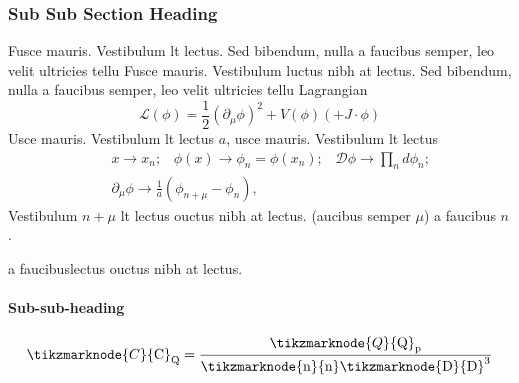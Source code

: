 \lipsum[5]
\lipsum[5]

\subsubsection{Sub Sub Section Heading}
\lipsum[5]

Fusce mauris. Vestibulum lt lectus. Sed bibendum, nulla a faucibus semper, leo velit
ultricies tellu\cite{Hastie_LASSO} Fusce mauris. Vestibulum luctus nibh at lectus. Sed bibendum, nulla a faucibus semper, leo velit
ultricies tellu \cite{bruinshoofd_terWell_2003} Lagrangian
\begin{equation}
\mathcal{L}(\phi)=\frac{1}{2}(\partial_\mu\phi)^2+V(\phi)(+J\cdot
\phi)\label{ch63:eqn63.1}
\end{equation}
Usce mauris. Vestibulum lt lectus $a$, usce mauris. Vestibulum lt lectus
\begin{eqnarray}
&&x\rightarrow x_n;\;\;\; \phi(x)\rightarrow \phi_n=\phi(x_n);\;\;\;
\mathcal{D}\phi\rightarrow \prod_n d\phi_n;\nonumber\\
&&\partial_\mu\phi\rightarrow
\frac{1}{a}(\phi_{n+\mu}-\phi_n),\label{ch63:eqn63.2}
\end{eqnarray}
Vestibulum $n+\mu$ lt lectus ouctus nibh at lectus. (aucibus semper
$\mu$) a faucibus $n$.

\lipsum[5] a faucibuslectus ouctus nibh at lectus.

\paragraph{Sub-sub-heading}
\lipsum[5]

\bigskip

\begin{equation}
\label{ch05:eqn5.9}
\tikzmarknode{C}{\mathrm{C}}_\mathrm{Q} = \frac{\tikzmarknode{Q}{\mathrm{Q}}_\mathrm{p}}{\mathrm{\tikzmarknode{n}{\mathrm{n}}\tikzmarknode{D}{D}}^3}
\end{equation}

